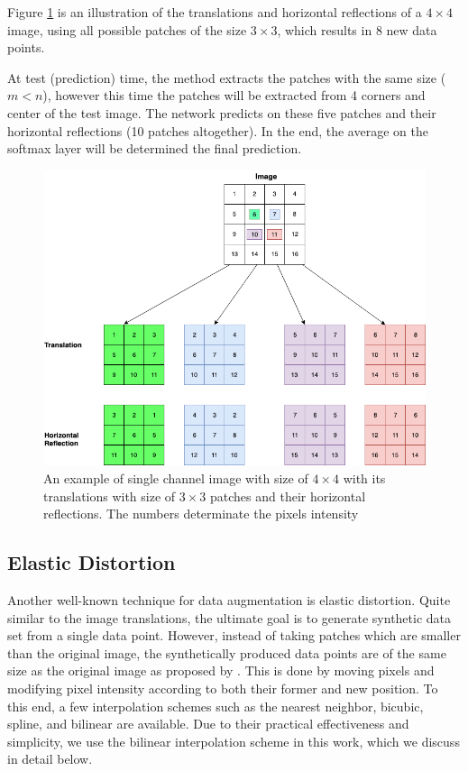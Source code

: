 Figure \ref{fig:label-preserving-trasformation} is an illustration of the translations and horizontal
reflections of a $4 \times 4$ image, using all
possible patches of the size $3 \times 3$, which results in $8$ new data points.

At test (prediction) time, the method extracts the patches with the same size ($m < n$), however this time the
patches will be extracted from 4 corners and center of the test image. The network predicts on these
five patches and their horizontal reflections (10 patches altogether). In the end, the average
on the softmax layer will be determined the final prediction.

\begin{figure}
  \centering
  \label{fig:label-preserving-trasformation}
  \includegraphics[width=1\textwidth]{fig/label-preserving-transformation}
  \caption{An example of single channel image with size of $4\times4$ with its translations with size of $3\times3$ patches and their horizontal reflections. The numbers determinate the pixels intensity}
\end{figure}


\subsection{Elastic Distortion}
\label{tit:elastic-distrotion}
Another well-known technique for data augmentation is elastic distortion. Quite similar to the image
translations, the ultimate goal is to generate synthetic data set from a single data point. However, instead of
taking patches which are smaller than the original image, the synthetically produced data points are
of the same size as the original image as proposed by \cite{elastic_distortion_paper} . This is done by moving pixels and modifying pixel intensity
according to both their former and new position.  To this end, a few interpolation schemes such as
the nearest neighbor, bicubic, spline, and bilinear are available. Due to their practical
effectiveness and simplicity, we use the bilinear interpolation scheme in this work, which we
discuss in detail below. 

